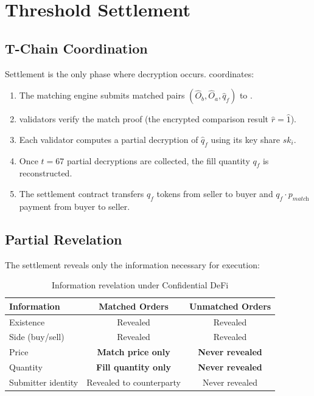 \section{Threshold Settlement}

\label{sec:settlement}

\subsection{T-Chain Coordination}

Settlement is the only phase where decryption occurs. \TChain{} coordinates:

\begin{enumerate}
    \item The matching engine submits matched pairs $(\hat{O}_b, \hat{O}_a, \hat{q}_f)$ to \TChain{}.
    \item \TChain{} validators verify the match proof (the encrypted comparison result $\hat{r} = \hat{1}$).
    \item Each validator computes a partial decryption of $\hat{q}_f$ using its key share $sk_i$.
    \item Once $t = 67$ partial decryptions are collected, the fill quantity $q_f$ is reconstructed.
    \item The settlement contract transfers $q_f$ tokens from seller to buyer and $q_f \cdot p_{\textit{match}}$ payment from buyer to seller.
\end{enumerate}

\subsection{Partial Revelation}

The settlement reveals only the information necessary for execution:

\begin{table}[h]
\centering
\begin{tabular}{lcc}
\toprule
\textbf{Information} & \textbf{Matched Orders} & \textbf{Unmatched Orders} \\
\midrule
Existence & Revealed & Revealed \\
Side (buy/sell) & Revealed & Revealed \\
Price & \textbf{Match price only} & \textbf{Never revealed} \\
Quantity & \textbf{Fill quantity only} & \textbf{Never revealed} \\
Submitter identity & Revealed to counterparty & Never revealed \\
\bottomrule
\end{tabular}
\caption{Information revelation under Confidential DeFi}
\label{tab:revelation}
\end{table}

